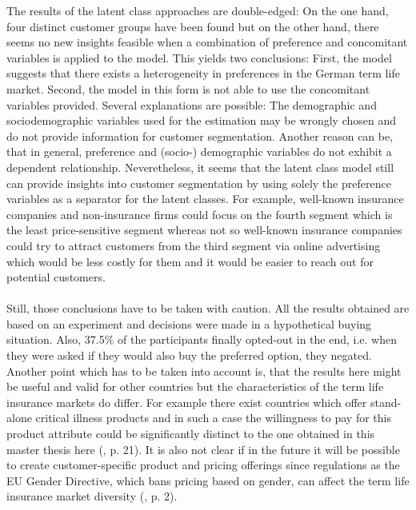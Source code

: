 \documentclass[12pt, abstracton]{article}
\begin{document}
The results of the latent class approaches are double-edged: On the one hand, four distinct customer groups have been found but on the other hand, there seems no new insights feasible when a combination of preference and concomitant variables is applied to the model. This yields two conclusions: First, the model suggests that there exists a heterogeneity in preferences in the German term life market. Second, the model in this form is not able to use the concomitant variables provided. Several explanations are possible: The demographic and sociodemographic variables used for the estimation may be wrongly chosen and do not provide information for customer segmentation. Another reason can be, that in general, preference and (socio-) demographic variables do not exhibit a dependent relationship. Neveretheless, it seems that the latent class model still can provide insights into customer segmentation by using solely the preference variables as a separator for the latent classes. For example, well-known insurance companies and non-insurance firms could focus on the fourth segment which is the least price-sensitive segment whereas not so well-known insurance companies could try to attract customers from the third segment via online advertising which would be less costly for them and it would be easier to reach out for potential customers.\\\\
Still, those conclusions have to be taken with caution. All the results obtained are based on an experiment and decisions were made in a hypothetical buying situation. Also, 37.5\% of the participants finally opted-out in the end, i.e. when they were asked if they would also buy the preferred option, they negated.\\
Another point which has to be taken into account is, that the results here might be useful and valid for other countries but the characteristics of the term life insurance markets do differ. For example there exist countries which offer stand-alone critical illness products and in such a case the willingness to pay for this product attribute could be significantly distinct to the one obtained in this master thesis here (\cite{Braun2014}, p. 21). It is also not clear if in the future it will be possible to create customer-specific product and pricing offerings since regulations as the EU Gender Directive, which bans pricing based on gender, can affect the term life insurance market diversity (\cite{Braun2014}, p. 2).
\cleardoublepage
\onehalfspacing
\nocite{*}


\cleardoublepage
\appendix
\end{document}
